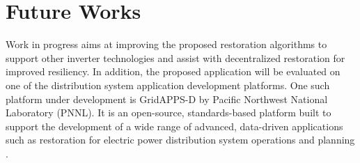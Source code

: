 \documentclass[12pt]{article}
\begin{document}
\section{Future Works}
Work in progress aims at improving the proposed restoration algorithms to support other inverter technologies and assist with decentralized restoration for improved resiliency. In addition, the proposed application will be evaluated on one of the distribution system application development platforms. One such platform under development is GridAPPS-D by Pacific Northwest National Laboratory (PNNL). It is an open-source, standards-based platform
built to support the development of a wide range of advanced, data-driven applications such as restoration for electric power distribution system operations and planning \cite{melton2018leveraging}.
\end{document}
